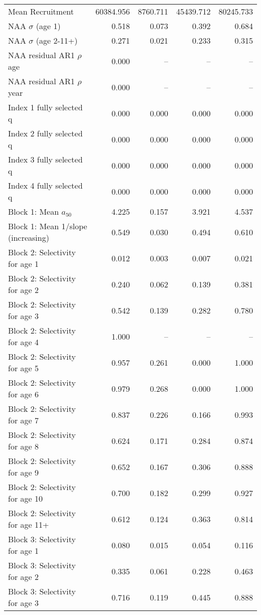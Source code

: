 \documentclass[
]{article}
\begin{document}
\begin{landscape}
\begin{longtable}[t]{lrrrr}
\endfoot
\bottomrule
\endlastfoot
Mean Recruitment & 60384.956 & 8760.711 & 45439.712 & 80245.733\\
NAA $\sigma$ (age 1) & 0.518 & 0.073 & 0.392 & 0.684\\
NAA $\sigma$ (age 2-11+) & 0.271 & 0.021 & 0.233 & 0.315\\
NAA residual AR1 $\rho$ age & 0.000 & -- & -- & --\\
NAA residual AR1 $\rho$ year & 0.000 & -- & -- & --\\
\addlinespace
Index 1 fully selected q & 0.000 & 0.000 & 0.000 & 0.000\\
Index 2 fully selected q & 0.000 & 0.000 & 0.000 & 0.000\\
Index 3 fully selected q & 0.000 & 0.000 & 0.000 & 0.000\\
Index 4 fully selected q & 0.000 & 0.000 & 0.000 & 0.000\\
Block 1: Mean $a_{50}$ & 4.225 & 0.157 & 3.921 & 4.537\\
\addlinespace
Block 1: Mean 1/slope (increasing) & 0.549 & 0.030 & 0.494 & 0.610\\
Block 2: Selectivity for age 1 & 0.012 & 0.003 & 0.007 & 0.021\\
Block 2: Selectivity for age 2 & 0.240 & 0.062 & 0.139 & 0.381\\
Block 2: Selectivity for age 3 & 0.542 & 0.139 & 0.282 & 0.780\\
Block 2: Selectivity for age 4 & 1.000 & -- & -- & --\\
\addlinespace
Block 2: Selectivity for age 5 & 0.957 & 0.261 & 0.000 & 1.000\\
Block 2: Selectivity for age 6 & 0.979 & 0.268 & 0.000 & 1.000\\
Block 2: Selectivity for age 7 & 0.837 & 0.226 & 0.166 & 0.993\\
Block 2: Selectivity for age 8 & 0.624 & 0.171 & 0.284 & 0.874\\
Block 2: Selectivity for age 9 & 0.652 & 0.167 & 0.306 & 0.888\\
\addlinespace
Block 2: Selectivity for age 10 & 0.700 & 0.182 & 0.299 & 0.927\\
Block 2: Selectivity for age 11+ & 0.612 & 0.124 & 0.363 & 0.814\\
Block 3: Selectivity for age 1 & 0.080 & 0.015 & 0.054 & 0.116\\
Block 3: Selectivity for age 2 & 0.335 & 0.061 & 0.228 & 0.463\\
Block 3: Selectivity for age 3 & 0.716 & 0.119 & 0.445 & 0.888\\

\end{longtable}
\end{landscape}
\end{document}
